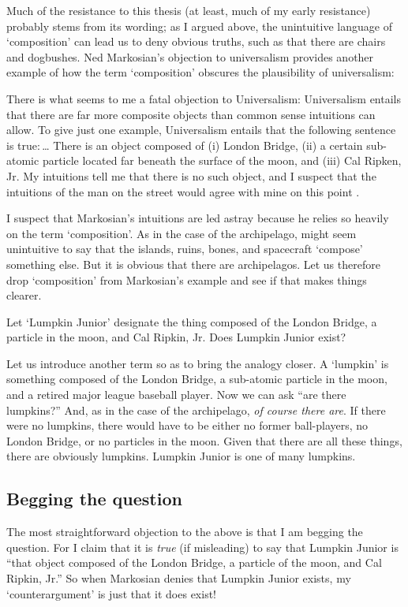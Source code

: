 \documentclass[11pt]{article}
\newenvironment{squote}{%
\begin{spacing}{1}
       	\begin{list}{}{%
\setlength{\labelwidth}{0pt}%
\rightmargin\leftmargin%
}
\item\relax
}{%
\end{list}%
\end{spacing}
}
\begin{document}
\begin{spacing}{1.25}
Much of the resistance to this thesis (at least, much of my early
resistance) probably stems from its wording; as I argued above, the
unintuitive language of `composition' can lead us to deny obvious
truths, such as that there are chairs and dogbushes.  Ned Markosian's
objection to universalism provides another example of how the term
`composition' obscures the plausibility of universalism:

\begin{squote}
There is what seems to me a fatal objection to Universalism:
Universalism entails that there are far more composite objects than
common sense intuitions can allow.  To give just one example,
Universalism entails that the following sentence is true:\,\ldots
There is an object composed of (i) London Bridge, (ii) a certain
sub-atomic particle located far beneath the surface of the moon, and
(iii) Cal Ripken, Jr.  My intuitions tell me that there is no such
object, and I suspect that the intuitions of the man on the street
would agree with mine on this point \citeyearpar[228]{markosian1998a}.
\end{squote}

I suspect that Markosian's intuitions are led astray because he relies
so heavily on the term `composition'.  As in the case of the
archipelago, might seem unintuitive to say that the islands, ruins,
bones, and spacecraft `compose' something else.  But it is obvious
that there are archipelagos.  Let us therefore drop `composition' from
Markosian's example and see if that makes things clearer.

Let `Lumpkin Junior' designate the thing composed of the London
Bridge, a particle in the moon, and Cal Ripkin, Jr.  Does Lumpkin
Junior exist?

Let us introduce another term so as to bring the analogy closer.  A
`lumpkin' is something composed of the London Bridge, a sub-atomic
particle in the moon, and a retired major league baseball player.  Now
we can ask ``are there lumpkins?''  And, as in the case of the
archipelago, {\em of course there are}.  If there were no lumpkins,
there would have to be either no former ball-players, no London
Bridge, or no particles in the moon.  Given that there are all these
things, there are obviously lumpkins.  Lumpkin Junior is one of many
lumpkins.

\subsection{Begging the question}
\label{beg}
The most straightforward objection to the above is that I am begging
the question.  For I claim that it is {\em true} (if misleading) to
say that Lumpkin Junior is ``that object composed of the London
Bridge, a particle of the moon, and Cal Ripkin, Jr.''  So when
Markosian denies that Lumpkin Junior exists, my `counterargument' is
just that it does exist!


\end{spacing}
\end{document}
